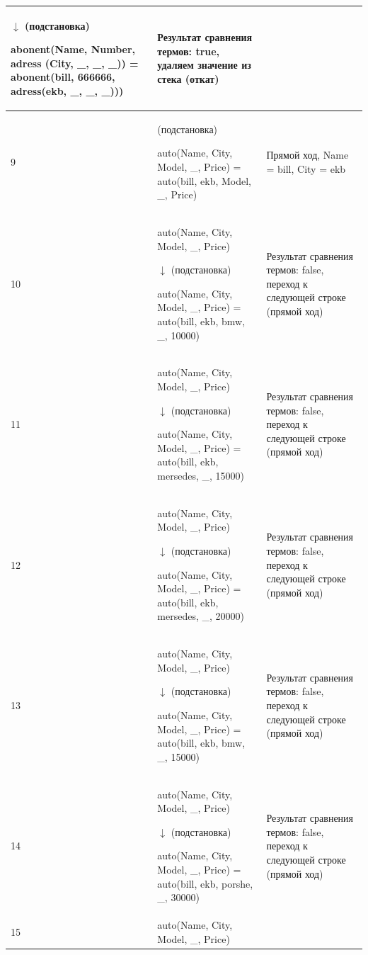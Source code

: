 \documentclass[a4paper,14pt]{extreport} %
\begin{document}
\begin{enumerate}
\begin{enumerate}
\begin{longtable}{|p{1.1cm}|p{8.5cm}|p{7cm}|}
		$\downarrow$  (подстановка)
	
	abonent(Name, Number, adress (City, \_, \_, \_)) = abonent(bill, 666666, adress(ekb, \_, \_, \_))) & Результат сравнения термов: true, удаляем значение из стека (откат) \\ \hline
	
	9 & (подстановка)
	
	auto(Name, City, Model, \_, Price) = auto(bill, ekb, Model, \_, Price) & Прямой ход, Name = bill, City = ekb \\ \hline
	
	10 & auto(Name, City, Model, \_, Price) 
	
		$\downarrow$  (подстановка)
	
	auto(Name, City, Model, \_, Price) = auto(bill, ekb, bmw, \_, 10000) & Результат сравнения термов: false, переход к следующей строке (прямой ход) \\ \hline
	
	11 & auto(Name, City, Model, \_, Price) 
	
		$\downarrow$  (подстановка)
	
	auto(Name, City, Model, \_, Price) = auto(bill, ekb, mersedes, \_, 15000) & Результат сравнения термов: false, переход к следующей строке (прямой ход) \\ \hline
	
	
	12 & auto(Name, City, Model, \_, Price) 
	
		$\downarrow$  (подстановка)
	
	auto(Name, City, Model, \_, Price) = auto(bill, ekb, mersedes, \_, 20000) & Результат сравнения термов: false, переход к следующей строке (прямой ход) \\ \hline
	
	
	13 & auto(Name, City, Model, \_, Price) 
	
		$\downarrow$  (подстановка)
	
	auto(Name, City, Model, \_, Price) = auto(bill, ekb, bmw, \_, 15000) & Результат сравнения термов: false, переход к следующей строке (прямой ход) \\ \hline
	
	14 & auto(Name, City, Model, \_, Price) 
	
		$\downarrow$  (подстановка)
	
	auto(Name, City, Model, \_, Price) = auto(bill, ekb, porshe, \_, 30000) & Результат сравнения термов: false, переход к следующей строке (прямой ход) \\ \hline
	15 & auto(Name, City, Model, \_, Price) 
	

\end{longtable}
\end{enumerate}
\end{enumerate}
\end{document}
